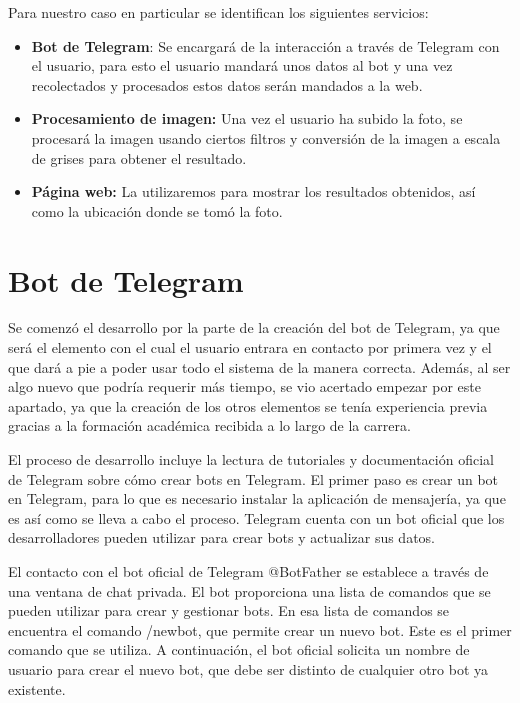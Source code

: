 Para nuestro caso en particular se identifican los siguientes servicios:
\begin{itemize}
    \item \textbf{Bot de Telegram}:
    Se encargará de la interacción a través de Telegram con el usuario, para esto el usuario mandará unos datos al bot y una vez recolectados y procesados estos datos serán mandados a la web.
    \item\textbf{ Procesamiento de imagen:}
    Una vez el usuario ha subido la foto, se procesará la imagen usando ciertos filtros y conversión de la imagen a escala de grises para obtener el resultado.
    \item \textbf{Página web:}
    La utilizaremos para mostrar los resultados obtenidos, así como la ubicación donde se tomó la foto.
\end{itemize}
\section{Bot de Telegram}
Se comenzó el desarrollo por la parte de la creación del bot de Telegram, ya que será el elemento con el cual el usuario entrara en contacto por primera vez y el que dará a pie a poder usar todo el sistema de la manera correcta. Además, al ser algo nuevo que podría requerir más tiempo, se vio acertado empezar por este apartado, ya que la creación de los otros elementos se tenía experiencia previa gracias a la formación académica recibida a lo largo de la carrera.

El proceso de desarrollo incluye la lectura de tutoriales y documentación oficial de Telegram sobre cómo crear bots en Telegram.
El primer paso es crear un bot en Telegram, para lo que es necesario instalar la aplicación de mensajería, ya que es así como se lleva a cabo el proceso. Telegram cuenta con un bot oficial que los desarrolladores pueden utilizar para crear bots y actualizar sus datos.

El contacto con el bot oficial de Telegram @BotFather se establece a través de una ventana de chat privada. El bot proporciona una lista de comandos que se pueden utilizar para crear y gestionar bots.
En esa lista de comandos se encuentra el comando /newbot, que permite crear un nuevo bot. Este es el primer comando que se utiliza. A continuación, el bot oficial solicita un nombre de usuario para crear el nuevo bot, que debe ser distinto de cualquier otro bot ya existente.

